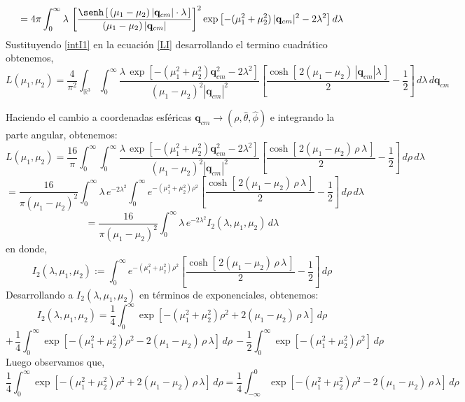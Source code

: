 \documentclass[12pt]{book}
\numberwithin{equation}{chapter}
\def\q{\mathbf{q}}
\def\R{\mathbb{R}}
\def\t{\theta}
\def\r{\rho}
\def\p{\phi}
\def\l{\lambda}
\begin{document}
\begin{equation}\label{intI1}
= 4\pi \int_{0}^{\infty} \l \, \left[ \frac{ \senh \left[\, (\mu_{1}-\mu_{2})\, |\q_{cm}|\cdot \l \, \right]}{ (\mu_{1}-\mu_{2})\, |\q_{cm}|} \right]^{2} \exp \left[ -(\mu_{1}^{2}+\mu_{2}^{2})\, |\q_{cm}|^{2} - 2 \l^{2} \right] d\l
\end{equation}
Sustituyendo \eqref{intI1} en la ecuaci\'on \eqref{LI} desarrollando el termino cuadr\'atico obtenemos,
$$L(\mu_{1},\mu_{2})= \frac{4}{\pi^{2}} \int_{\R^{3}} \int_{0}^{\infty} \frac{\l \, \exp \left[ -(\mu_{1}^{2}+\mu_{2}^{2})\q_{cm}^{2} -2\l^{2} \right] }{(\mu_{1}-\mu_{2})^{2} |\q_{cm}|^{2}} \left[ \frac{ \cosh [\, 2(\mu_{1}-\mu_{2})\,|\q_{cm}|\l \,] }{2} - \frac{1}{2} \right]  \,d\l \, d\q_{cm}  $$

\newpage

Haciendo el cambio a coordenadas esf\'ericas $\q_{cm} \rightarrow (\r,\hat{\t},\hat{\p}) $ e integrando la parte angular, obtenemos:
$$L(\mu_{1},\mu_{2})= \frac{16}{\pi} \int_{0}^{\infty} \int_{0}^{\infty} \frac{\l \, \exp \left[ -(\mu_{1}^{2}+\mu_{2}^{2})\q_{cm}^{2} -2\l^{2} \right] }{(\mu_{1}-\mu_{2})^{2} |\q_{cm}|^{2}} \left[ \frac{ \cosh [\, 2(\mu_{1}-\mu_{2})\, \r \, \l \,] }{2} - \frac{1}{2} \right] \, d\r \,d\l   $$
$$=\frac{16}{\pi (\mu_{1}-\mu_{2})^{2}} \int_{0}^{\infty} \l \, e^{-2\l^{2}} \int_{0}^{\infty} e^{-(\mu_{1}^{2}+\mu_{2}^{2})\r^{2} } \left[ \frac{ \cosh [\, 2(\mu_{1}-\mu_{2})\, \r \, \l \,] }{2} - \frac{1}{2} \right] \, d\r \, d\l $$
\begin{equation}\label{LI-2}
= \frac{16}{\pi (\mu_{1}-\mu_{2})^{2}} \int_{0}^{\infty} \l \, e^{-2\l^{2}} I_{2}(\l ,\mu_{1},\mu_{2})   \, d\l
\end{equation}
en donde,
$$ I_{2}(\l ,\mu_{1},\mu_{2}) := \int_{0}^{\infty} e^{-(\mu_{1}^{2}+\mu_{2}^{2})\r^{2} } \left[ \frac{ \cosh [\, 2(\mu_{1}-\mu_{2})\, \r \, \l \,] }{2} - \frac{1}{2} \right] \, d\r $$
Desarrollando a $I_{2}(\l ,\mu_{1},\mu_{2})$ en t\'erminos de exponenciales, obtenemos:
$$ I_{2}(\l ,\mu_{1},\mu_{2})= \frac{1}{4}  \int_{0}^{\infty}\exp[-(\mu_{1}^{2}+\mu_{2}^{2})\r^{2}+ 2(\mu_{1}-\mu_{2})\, \r \, \l  ]\,d\r $$
\begin{equation}\label{I2exp}
+\,  \frac{1}{4} \int_{0}^{\infty}\exp[-(\mu_{1}^{2}+\mu_{2}^{2})\r^{2}- 2(\mu_{1}-\mu_{2})\, \r \, \l  ]\,d\r \, - \frac{1}{2} \int_{0}^{\infty} \exp[-(\mu_{1}^{2}+\mu_{2}^{2})\r^{2}] \, d\r
\end{equation}
Luego observamos que,
$$ \frac{1}{4}  \int_{0}^{\infty}\exp[-(\mu_{1}^{2}+\mu_{2}^{2})\r^{2}+ 2(\mu_{1}-\mu_{2})\, \r \, \l  ]\,d\r= 
\frac{1}{4}  \int_{-\infty}^{0}\exp[-(\mu_{1}^{2}+\mu_{2}^{2})\r^{2}- 2(\mu_{1}-\mu_{2})\, \r \, \l  ]\,d\r$$ 
\end{document}

